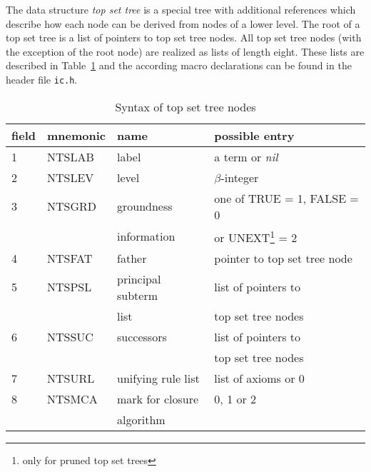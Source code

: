 The data structure {\em top set tree} is a special tree with additional 
references which describe how each node can be derived from nodes of
a lower level.
The root of a top set tree is a list of pointers to top set tree nodes.
All top set tree nodes (with the exception of the root node) are realized
as lists of length eight.
These lists are described in Table~\ref{tb:tst} and the according
macro declarations can be found in the header file {\tt ic.h}.
\begin{table}
\begin{minipage}{5.9in}
\begin{center}
\begin{tabular}{|l|l|l|l|}
 \hline
 field & mnemonic & name & possible entry \\
 \hline\hline
 1 & NTSLAB & label & a term or {\it nil} \\
 \hline
 2 & NTSLEV & level & $\beta$-integer \\
 \hline
 3 & NTSGRD & groundness & one of TRUE = 1, FALSE = 0 \\
   &        & information & or UNEXT\footnote{only for pruned top set trees}
                                                  = 2  \\
 \hline
 4 & NTSFAT & father & pointer to top set tree node \\
 \hline
 5 & NTSPSL & principal subterm & list of pointers to \\
   &        & list      & top set tree nodes \\
 \hline
 6 & NTSSUC & successors & list of pointers to \\
   &        &            & top set tree nodes \\
 \hline
 7 & NTSURL & unifying rule list  & list of axioms or 0 \\
 \hline
 8 & NTSMCA & mark for closure   & 0, 1 or 2 \\
   &        & algorithm & \\
 \hline
\end{tabular}
\caption{Syntax of top set tree nodes} \label{tb:tst}
\end{center}
\end{minipage}
\end{table}

